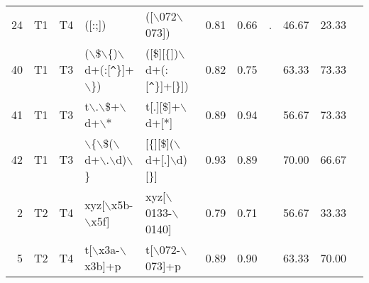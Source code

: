 \begin{table*}[ht]
\begin{tabular}{rllllrrlrrl}
  24 & T1 & T4 & ([:;]) & ([$\backslash$072$\backslash$073]) & 0.81 & 0.66 & . & 46.67 & 23.33 &   \\ 
  40 & T1 & T3 & ($\backslash$\$$\backslash$\{)$\backslash$d+(:[\verb|^|\}]+$\backslash$\}) & ([\$][\{])$\backslash$d+(:[\verb|^|\}]+[\}]) & 0.82 & 0.75 &   & 63.33 & 73.33 &   \\ 
  41 & T1 & T3 & t$\backslash$.$\backslash$\$+$\backslash$d+$\backslash$* & t[.][\$]+$\backslash$d+[*] & 0.89 & 0.94 &   & 56.67 & 73.33 &   \\ 
  42 & T1 & T3 & $\backslash$\{$\backslash$\$($\backslash$d+$\backslash$.$\backslash$d)$\backslash$\} & [\{][\$]($\backslash$d+[.]$\backslash$d)[\}] & 0.93 & 0.89 &   & 70.00 & 66.67 &   \\ 
  2 & T2 & T4 & xyz[$\backslash$x5b-$\backslash$x5f] & xyz[$\backslash$0133-$\backslash$0140] & 0.79 & 0.71 &   & 56.67 & 33.33 &   \\ 
  5 & T2 & T4 & t[$\backslash$x3a-$\backslash$x3b]+p & t[$\backslash$072-$\backslash$073]+p & 0.89 & 0.90 &   & 63.33 & 70.00 &   \\ 
   \hline
\end{tabular}
\end{table*}
